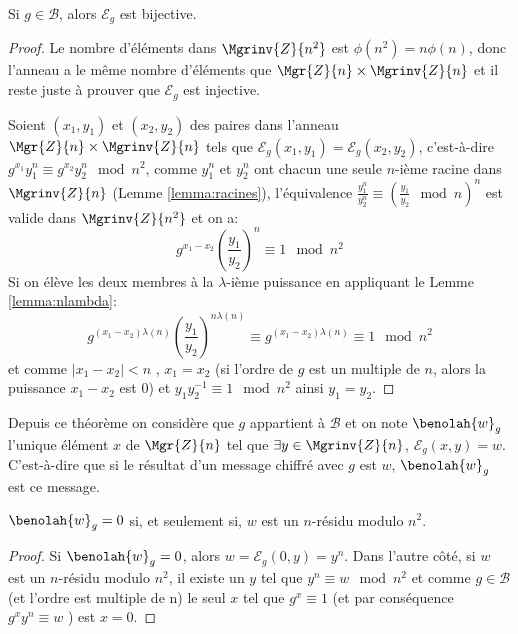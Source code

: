 	\begin{theorem}
		\label{theorem:bijective}
		Si $g \in \mathcal{B}$, alors $\mathcal{E}_g$ est bijective.
		\begin{proof}
			Le nombre d'éléments dans $\Mgrinv{Z}{n^2}$ est $\phi(n^2) = n\phi(n)$, donc l'anneau a le même nombre
			d'éléments que $\Mgr{Z}{n} \times \Mgrinv{Z}{n}$ et il reste juste à prouver que $\mathcal{E}_g$ est injective.

			Soient $(x_1,y_1)$ et $(x_2, y_2)$ des paires dans l'anneau $\Mgr{Z}{n}\times\Mgrinv{Z}{n}$ tels que 
			$\mathcal{E}_{g}(x_1,y_1) = \mathcal{E}_{g}(x_2,y_2)$, c'est-à-dire
			$g^{x_1}y_1^n \equiv g^{x_2}y_2^n\mod{n^2}$, comme $y_1^n$ et $y_2^n$ ont chacun une 
			seule $n$-ième racine dans $\Mgrinv{Z}{n}$ (Lemme \ref{lemma:racines}), l'équivalence $\frac{y_1^n}{y_2^n} \equiv (\frac{y_1}{y_2}\mod{n})^n$ 
			est valide dans $\Mgrinv{Z}{n^2}$ et on a:
				\begin{equation*}
					g^{x_1-x_2}\left(\frac{y_1}{y_2}\right)^n \equiv 1\mod{n^2}
				\end{equation*}
			Si on élève les deux membres à la $\lambda$-ième puissance en appliquant le Lemme \ref{lemma:nlambda}:
				\begin{equation*}
					g^{(x_1-x_2)\lambda(n)}\left(\frac{y_1}{y_2}\right)^{n\lambda(n)}\equiv g^{(x_1-x_2)\lambda(n)} \equiv 1\mod{n^2}
				\end{equation*}
				et comme $|x_1-x_2| < n$ , $x_1 = x_2$ (si l'ordre de $g$ est un multiple de $n$, alors la puissance $x_1-x_2$ est $0$) et $y_1y_2^{-1}\equiv 1\mod{n^2}$
				ainsi $y_1 = y_2$.
		\end{proof}
	\end{theorem}

	Depuis ce théorème on considère que $g$ appartient à $\mathcal{B}$ et on note $\benolah{w}_g$ 
	l'unique élément $x$ de $\Mgr{Z}{n}$ tel que $\exists y \in \Mgrinv{Z}{n}$, $\mathcal{E}_g(x,y) = w$. C'est-à-dire 
	que si le résultat d'un message chiffré avec $g$ est $w$, $\benolah{w}_g$ est ce message.

	\begin{lemma} $\benolah{w}_g = 0$ si, et seulement si, $w$ est un $n$-résidu modulo  $n^2$.
		\begin{proof}
			Si $\benolah{w}_g = 0$, alors $w = \mathcal{E}_g(0,y) = y^n$. Dans l'autre côté, si $w$ est un $n$-résidu modulo ${n^2}$,
			il existe un $y$ tel que $y^n \equiv w\mod{n^2}$ et comme $g \in \mathcal{B}$ (et l'ordre est multiple de n) le seul $x$ tel que $g^x \equiv 1$ (et par conséquence $g^xy^n \equiv w$ ) est $x = 0$. 
		\end{proof}
	\end{lemma}


